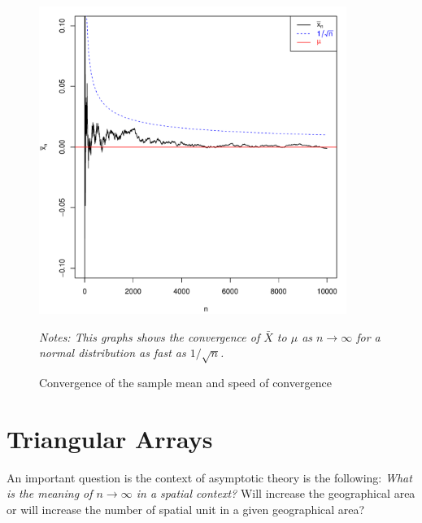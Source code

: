 \begin{figure}[H]
  \caption{Convergence of the sample mean and speed of convergence}
    \label{fig:Op_example}
        \centering
    \begin{minipage}{.9\linewidth}
\begin{knitrout}
\color{fgcolor}

{\centering \includegraphics[width=10cm,height=10cm]{figure/CLT-normalplot-bigO-1} 

}


\end{knitrout}
\footnotesize
		\emph{Notes: This graphs shows the convergence of $\bar{X}$ to $\mu$ as $n\to\infty$ for a normal distribution as fast as $1/\sqrt{n}$.}
	\end{minipage}
\end{figure}

\section{Triangular Arrays}\label{sec:triangular-array}

An important question is the context of asymptotic theory is the following: \emph{What is the meaning of $n\to \infty$ in a spatial context?} Will increase the geographical area or will increase the number of spatial unit in a given geographical area? 

